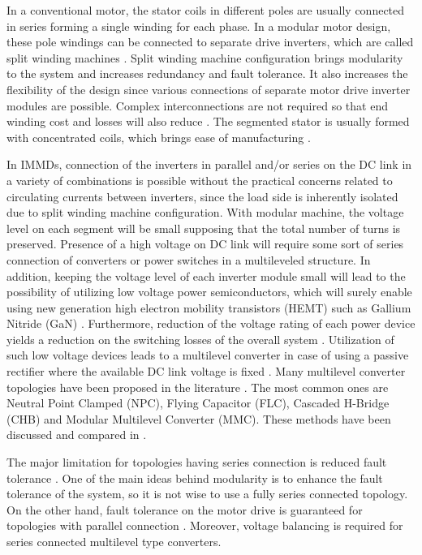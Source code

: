 \documentclass[conference,a4paper,twocolumn]{IEEEtran}
\begin{document}
In a conventional motor, the stator coils in different poles are usually connected in series forming a single winding for each phase. In a modular motor design, these pole windings can be connected to separate drive inverters, which are called split winding machines \cite{Galassini2015,Wang2013,Wang2015b}. Split winding machine configuration brings modularity to the system and increases redundancy and fault tolerance. It also increases the flexibility of the design since various connections of separate motor drive inverter modules are possible. Complex interconnections are not required so that end winding cost and losses will also reduce \cite{Wang2015b}. The segmented stator is usually formed with concentrated coils, which brings ease of manufacturing \cite{Lambert2015a}.

In IMMDs, connection of the inverters in parallel and/or series on the DC link in a variety of combinations is possible without the practical concerns related to circulating currents between inverters, since the load side is inherently isolated due to split winding machine configuration. With modular machine, the voltage level on each segment will be small supposing that the total number of turns is preserved. Presence of a high voltage on DC link will require some sort of series connection of converters or power switches in a multileveled structure. In addition, keeping the voltage level of each inverter module small will lead to the possibility of utilizing low voltage power semiconductors, which will surely enable using new generation high electron mobility transistors (HEMT) such as Gallium Nitride (GaN) \cite{Wang2015b}. Furthermore, reduction of the voltage rating of each power device yields a reduction on the switching losses of the overall system \cite{LoCalzo2016}. Utilization of such low voltage devices leads to a multilevel converter in case of using a passive rectifier where the available DC link voltage is fixed \cite{Wang2013}. Many multilevel converter topologies have been proposed in the literature \cite{Wang2014}. The most common ones are Neutral Point Clamped (NPC), Flying Capacitor (FLC), Cascaded H-Bridge (CHB) and Modular Multilevel Converter (MMC). These methods have been discussed and compared in \cite{LoCalzo2016,Wang2014,Wang2015b}.

The major limitation for topologies having series connection is reduced fault tolerance \cite{Galassini2015}. One of the main ideas behind modularity is to enhance the fault tolerance of the system, so it is not wise to use a fully series connected topology. On the other hand, fault tolerance on the motor drive is guaranteed for topologies with parallel connection \cite{Galassini2015}. Moreover, voltage balancing is required for series connected multilevel type converters.
\end{document}
